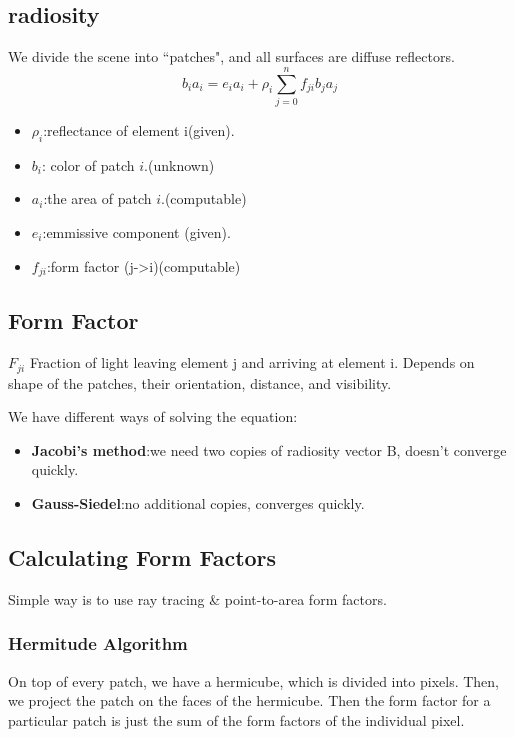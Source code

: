 \documentclass[landscape,4pt,a4paper]{article}
\begin{document}
\begin{multicols*}{5}
			\subsection{radiosity}	
				We divide the scene into ``patches", and all surfaces are diffuse reflectors.	
				\[b_{i} a_{i}=e_{i}a_{i}+\rho_{i}\sum_{j=0}^{n}f_{ji}b_{j}a_{j}\]
				\begin{itemize}
						\item{$\rho_{i}$}:reflectance of element i(given).
						\item{$b_{i}$}: color of patch $i$.(unknown)
						\item{$a_{i}$}:the area of patch $i$.(computable)
						\item{$e_{i}$}:emmissive component (given).
						\item{$f_{ji}$}:form factor (j->i)(computable)
				\end{itemize}
			\subsection{Form Factor}
				$F_{ji}$ Fraction of light leaving element j and arriving at element i.
				Depends on shape of the patches, their orientation, distance, and visibility.
				
				We have different ways of solving the equation:
				\begin{itemize}
						\item{\textbf{Jacobi's method}}:we need two copies of radiosity vector B,
								doesn't converge quickly.
						\item{\textbf{Gauss-Siedel}}:no additional copies, converges quickly.
				\end{itemize}
			\subsection{Calculating Form Factors}
				Simple way is to use ray tracing \& point-to-area form factors.
				\subsubsection{Hermitude Algorithm}
					On top of every patch, we have a hermicube, which is divided into pixels. Then, we project
					the patch on the faces of the hermicube. Then the form factor for a particular patch is just the 
					sum of the form factors of the individual pixel.

\end{multicols*}
\end{document}
